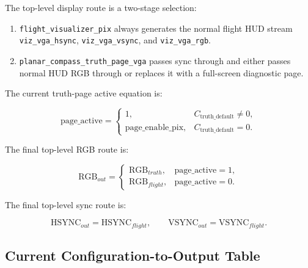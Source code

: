 \documentclass[letterpaper, final, onecolumn, titlepage]{article}
\DeclareRobustCommand{\sig}[1]{\nolinkurl{#1}}
\begin{document}
The top-level display route is a two-stage selection:

\begin{enumerate}[leftmargin=*]
  \item \sig{flight_visualizer_pix} always generates the normal flight HUD stream
  \sig{viz_vga_hsync}, \sig{viz_vga_vsync}, and \sig{viz_vga_rgb}.
  \item \sig{planar_compass_truth_page_vga} passes sync through and either passes
  normal HUD RGB through or replaces it with a full-screen diagnostic page.
\end{enumerate}

The current truth-page active equation is:

\begin{equation}
\mathrm{page\_active}
=
\begin{cases}
1, & C_{\mathrm{truth\_default}} \ne 0, \\
\mathrm{page\_enable\_pix}, & C_{\mathrm{truth\_default}} = 0.
\end{cases}
\label{eq:page-active}
\end{equation}

The final top-level RGB route is:

\begin{equation}
\mathrm{RGB}_{out}
=
\begin{cases}
\mathrm{RGB}_{truth}, & \mathrm{page\_active}=1,\\
\mathrm{RGB}_{flight}, & \mathrm{page\_active}=0.
\end{cases}
\label{eq:top-rgb-route}
\end{equation}

The final top-level sync route is:

\begin{equation}
\mathrm{HSYNC}_{out}=\mathrm{HSYNC}_{flight},
\qquad
\mathrm{VSYNC}_{out}=\mathrm{VSYNC}_{flight}.
\label{eq:sync-pass}
\end{equation}

\subsection{Current Configuration-to-Output Table}
\end{document}
